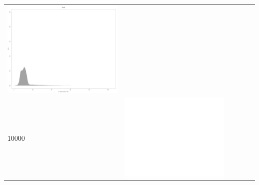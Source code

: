\begin{table}[htbp]
{\begin{tabular}{l | ccccc}
\begin{minipage}{.15\textwidth}
     			 	\includegraphics[width=\linewidth]{images/mema-dens-graph/I13}
    				 \end{minipage}\\
		10000  &	 \begin{minipage}{.15\textwidth}\vspace{2pt}     							
     			 	\includegraphics[width=\linewidth]{images/mema-dens-graph/I5}
    				 \end{minipage}
    			   &	 \begin{minipage}{.15\textwidth}\vspace{2pt}     							

\end{minipage}
\end{tabular}}
\end{table}
